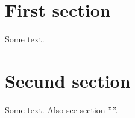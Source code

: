 \documentclass{article}
\begin{document}
\section{First section}\label{test}

Some text.

\section{Secund section}

Some text. Also see section ''''.
\end{document}
